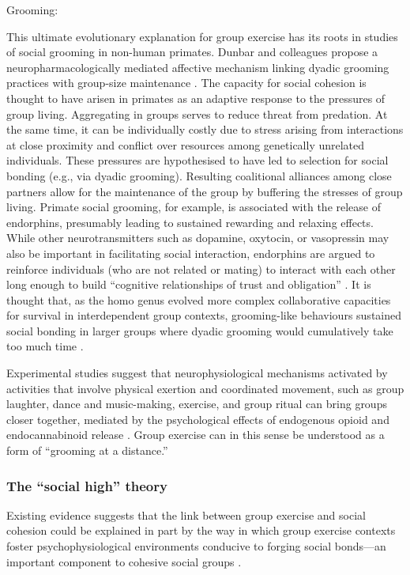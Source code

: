 Grooming:


This ultimate evolutionary explanation for group exercise has its roots in studies of social grooming in non-human primates. Dunbar and colleagues propose a neuropharmacologically mediated affective mechanism linking dyadic grooming practices with group-size maintenance \citep{Machin2011}.  The capacity for social cohesion is thought to have arisen in primates as an adaptive response to the pressures of group living.  Aggregating in groups serves to reduce threat from predation.  At the same time, it can be individually costly due to stress arising from interactions at close proximity and conflict over resources among genetically unrelated individuals.  These pressures are hypothesised to have led to selection for social bonding (e.g., via dyadic grooming).  Resulting coalitional alliances among close partners allow for the maintenance of the group by buffering the stresses of group living.  Primate social grooming, for example, is associated with the release of endorphins, presumably leading to sustained rewarding and relaxing effects.  While other neurotransmitters such as dopamine, oxytocin, or vasopressin may also be important in facilitating social interaction, endorphins are argued to reinforce individuals (who are not related or mating) to interact with each other long enough to build ``cognitive relationships of trust and obligation'' \citep[1839]{Dunbar2012}.  It is thought that, as the homo genus evolved more complex collaborative capacities for survival in interdependent group contexts, grooming-like behaviours sustained social bonding in larger groups where dyadic grooming would cumulatively take too much time \citep{Dunbar2012}.

Experimental studies suggest that neurophysiological mechanisms activated by activities that involve physical exertion and coordinated movement, such as group laughter, dance and music-making, exercise, and group ritual can bring groups closer together, mediated by the psychological effects of endogenous opioid and endocannabinoid release \citep{Cohen2009,Fischer2014a,Fischer2014,Sullivan2014,Tarr2016,Tarr2015}.  Group exercise can in this sense be understood as a form of ``grooming at a distance.''

\subsubsection{The ``social high'' theory\label{sect:socialHigh}}

Existing evidence suggests that the link between group exercise and social cohesion could be explained in part by the way in which group exercise contexts foster psychophysiological environments conducive to forging social bonds---an important component to cohesive social groups \citep{Dunbar2010}.







